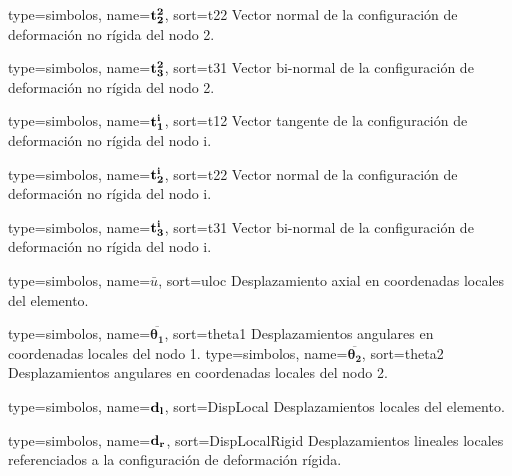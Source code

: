 {
	type={simbolos},
	name={$\bf{t_2^2}$}, %
	sort={t22} %
}
{Vector normal de la configuración de deformación no rígida del nodo 2.}

{
	type={simbolos},
	name={$\bf{t_3^2}$}, %
	sort={t31} %
}
{Vector bi-normal de la configuración de deformación no rígida del nodo 2.}

{
	type={simbolos},
	name={$\bf{t_1^i}$}, %
	sort={t12} %
}
{Vector tangente de la configuración de deformación no rígida del nodo i.}

{
	type={simbolos},
	name={$\bf{t_2^i}$}, %
	sort={t22} %
}
{Vector normal de la configuración de deformación no rígida del nodo i.}

{
	type={simbolos},
	name={$\bf{t_3^i}$}, %
	sort={t31} %
}
{Vector bi-normal de la configuración de deformación no rígida del nodo i.}

{
	type={simbolos},
	name={$\bar{u}$}, %
	sort={uloc} %
}
{Desplazamiento axial en coordenadas locales del elemento.}

{
	type={simbolos},
	name={$\boldsymbol{\overline{\theta_1}}$}, %
	sort={theta1} %
}
{Desplazamientos angulares en coordenadas locales del nodo 1.}
{
	type={simbolos},
	name={$\boldsymbol{\overline{\theta_2}}$}, %
	sort={theta2} %
}
{Desplazamientos angulares en coordenadas locales del nodo 2.}

{
	type={simbolos},
	name={$\bf{d}_l$}, %
	sort={DispLocal} %
}
{Desplazamientos locales del elemento.}

{
	type={simbolos},
	name={$\bf{d}_r$}, %
	sort={DispLocalRigid} %
}
{Desplazamientos lineales locales referenciados a la configuración de deformación rígida.}


